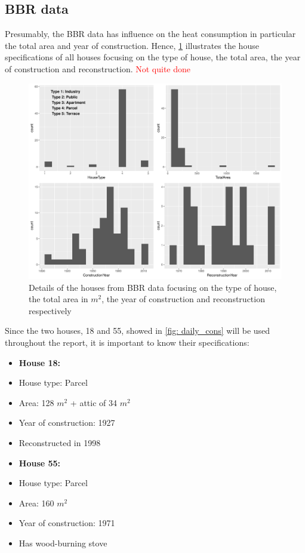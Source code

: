 \subsection{BBR data}
Presumably, the BBR data has influence on the heat consumption in particular the total area and year of construction. Hence, \cref{fig: bbr_hist} illustrates the house specifications of all houses focusing on the type of house, the total area, the year of construction and reconstruction. \textcolor{red}{Not quite done}
\begin{figure}
    \centering
    \includegraphics[width=1.\textwidth]{../../../figures/bbr_hist.pdf}
    \caption{Details of the houses from BBR data focusing on the type of house, the total area in $m^2$, the year of construction and reconstruction respectively}
    \label{fig: bbr_hist}
\end{figure}
Since the two houses, 18 and 55, showed in \cref{fig: daily_cons} will be used throughout the report, it is important to know their specifications:
\begin{multicols}{2}
    \begin{itemize}
        \item[]\textbf{House 18:}
        \item House type: Parcel
        \item Area: 128 $m^2$ + attic of 34 $m^2$
        \item Year of construction: 1927
        \item Reconstructed in 1998
    \end{itemize}
    \columnbreak
    \begin{itemize}
        \item[]\textbf{House 55:}
        \item House type: Parcel
        \item Area: 160 $m^2$ 
        \item Year of construction: 1971
        \item Has wood-burning stove 
    \end{itemize}
\end{multicols}

